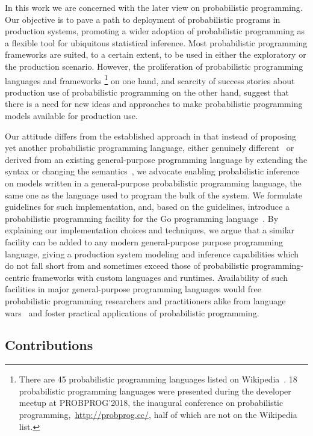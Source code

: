 \documentclass[sigplan,review,10pt,anonymous]{acmart}
\begin{document}
\begin{sloppypar}
  In this work we are concerned with the later view on
  probabilistic programming. Our objective is to pave a path
  to deployment of probabilistic programs in production
  systems, promoting a wider adoption of probabilistic
  programming as a flexible tool for ubiquitous statistical
  inference. Most probabilistic programming frameworks are
  suited, to a certain extent, to be used in either the
  exploratory or the production scenario. However, the
  proliferation of probabilistic programming languages and
  frameworks \footnote{There are 45 probabilistic programming
  languages listed on
  Wikipedia~\cite{wiki:Probabilistic_programming_language}. 18
  probabilistic programming languages were presented during
  the developer meetup at PROBPROG'2018, the inaugural
  conference on probabilistic
  programming,~\url{http://probprog.cc/}, half of which are
  not on the Wikipedia list.} on one hand, and scarcity of success
  stories about production use of probabilistic programming on
  the other hand, suggest that there is a need for new ideas
  and approaches to make probabilistic programming models
  available for production use.

  Our attitude differs from the established approach in that
  instead of proposing yet another probabilistic programming
  language, either genuinely different~\cite{MMR+07,Stan17} or
  derived from an existing general-purpose programming
  language by extending the syntax or changing the
  semantics~\cite{GMR+08,TMY+16,GXG18}, we advocate enabling
  probabilistic inference on models written in a
  general-purpose probabilistic programming language, the same
  one as the language used to program the bulk of the system. 
  We formulate guidelines for such implementation, and, based
  on the guidelines, introduce a probabilistic programming
  facility for the Go programming language~\cite{Golang}. By
  explaining our implementation choices and techniques,
  we argue that a similar facility can be added to any modern
  general-purpose purpose programming language, giving a
  production system modeling and inference capabilities which
  do not fall short from and sometimes exceed those of
  probabilistic programming-centric frameworks with custom
  languages and runtimes. Availability of such facilities
  in major general-purpose programming languages would free
  probabilistic programming researchers and practitioners
  alike from language wars~\cite{SH14} and foster practical
  applications of probabilistic programming.

  \subsection*{Contributions}


\end{sloppypar}
\end{document}
